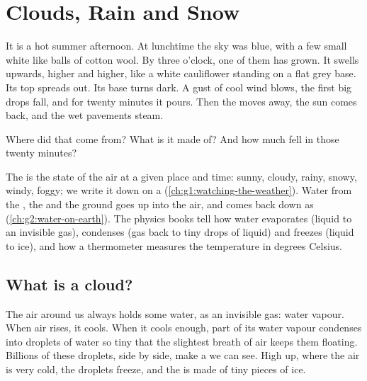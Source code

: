 \chapter{Clouds, Rain and Snow}\label{ch:g4:clouds-rain-snow}

It is a hot summer afternoon. At lunchtime the sky was blue, with a few
small white  like balls of cotton wool. By three o'clock, one of them
has grown. It swells upwards, higher and higher, like a white cauliflower
standing on a flat grey base. Its top spreads out. Its base turns dark. A
gust of cool wind blows, the first big drops fall, and for twenty minutes
it pours. Then the  moves away, the sun comes back, and the wet
pavements steam.

Where did that  come from? What is it made of? And how much  fell
in those twenty minutes?

\begin{recall}
The  is the state of the air at a given place and time: sunny,
cloudy, rainy, snowy, windy, foggy; we write it down on a 
(\cref{ch:g1:watching-the-weather}). Water from the , the  and the
ground goes up into the air, and comes back down as 
(\cref{ch:g2:water-on-earth}). The physics books tell how water evaporates
(liquid to an invisible gas), condenses (gas back to tiny drops of liquid)
and freezes (liquid to ice), and how a thermometer measures the temperature
in degrees Celsius.
\end{recall}

\section{What is a cloud?}

The air around us always holds some water, as an invisible gas: water
vapour. When air rises, it cools. When it cools enough, part of its water
vapour condenses into droplets of water so tiny that the slightest breath
of air keeps them floating. Billions of these droplets, side by side, make
a  we can see. High up, where the air is very cold, the droplets
freeze, and the  is made of tiny pieces of ice.

